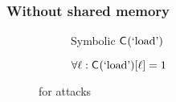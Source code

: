 \subsubsection{Without shared memory}
\label{dinome:sec:exp:cache:normal:unshared}
\begin{figure}
\begin{subfigure}[t]{0.495\linewidth}
\resizebox{\linewidth}{!}{\protect\small}
\caption{Symbolic $\mathsf{C}_{}(\textrm{`load'})$ \label{fig:normalcache:jaccard:unsharedsymload} }
\end{subfigure}%
\begin{subfigure}[t]{0.495\linewidth}
\resizebox{\linewidth}{!}{\protect\small}
\caption{$\forall \ell: \mathsf{C}_{}(\textrm{`load'})[\ell] = 1$ }
\label{fig:normalcache:jaccard:prime}
\end{subfigure}%
\caption{\JaccardRand{\secretsSetSize} for \primeprobe attacks}
\label{fig:normalcache:jaccard:unshared}
\end{figure}
\setlength{\tabcolsep}{0.3ex}
\renewcommand{\arraystretch}{1.3}

